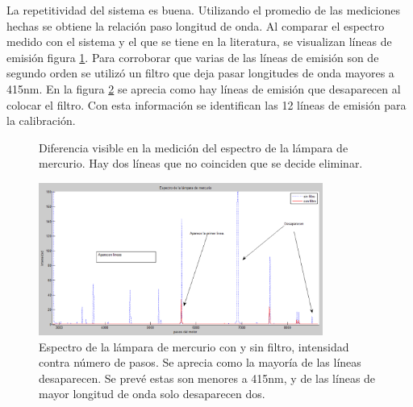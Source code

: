 La repetitividad del sistema es buena. Utilizando el promedio de las mediciones hechas se obtiene la relación paso longitud de onda. Al comparar el espectro medido con el sistema y el que se tiene en la literatura, se visualizan líneas de emisión  figura \ref{fig:espectroCompa}.
Para corroborar que varias de las líneas de emisión son de segundo orden se utilizó un filtro que deja pasar longitudes de onda mayores a 415nm. En la figura \ref{fig:hgfiltro} se aprecia como hay líneas de emisión que desaparecen al colocar el filtro. Con esta información se identifican las 12 líneas de emisión para la calibración.
\begin{figure}[h]
	\centering
	\caption{Diferencia visible en la medición del espectro de la lámpara de mercurio. Hay dos líneas que no coinciden que se decide eliminar.}
	\label{fig:espectroCompa}
\end{figure}
\begin{figure}[h]
	\centering
	\includegraphics[width=0.75\linewidth, height=5cm]{Imagenes/3/HgFiltro}
	\caption[Espectro de la lámpara de mercurio con y sin filtro, intensidad contra pasos.]{Espectro de la lámpara de mercurio con y sin filtro, intensidad contra número de pasos. Se aprecia como la mayoría de las líneas desaparecen. Se prevé estas son menores a 415nm, y de las líneas de mayor longitud de onda solo desaparecen dos.}
	\label{fig:hgfiltro}
\end{figure}


